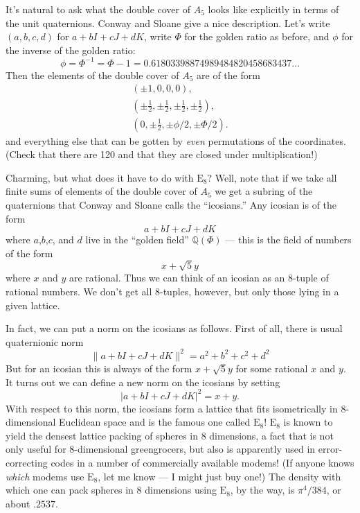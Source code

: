 \documentclass{article}
\begin{document}
It's natural to ask what the double cover of \(A_5\) looks like
explicitly in terms of the unit quaternions. Conway and Sloane give a
nice description. Let's write \((a,b,c,d)\) for \(a + bI + cJ + dK\),
write \(\Phi\) for the golden ratio as before, and \(\phi\) for the inverse of
the golden ratio:
\[\phi = \Phi^{-1} = \Phi -1 = 0.61803398874989484820458683437\ldots\] Then the
elements of the double cover of \(A_5\) are of the form \[
  \begin{gathered}
    (\pm 1, 0, 0, 0),
  \\(\pm \frac{1}{2}, \pm \frac{1}{2}, \pm \frac{1}{2}, \pm \frac{1}{2}),
  \\(0, \pm\frac{1}{2}, \pm \phi/2, \pm \Phi/2).
  \end{gathered}
\] and everything else that can be gotten by \emph{even} permutations of
the coordinates. (Check that there are 120 and that they are closed
under multiplication!)

Charming, but what does it have to do with \(\mathrm{E}_8\)? Well, note
that if we take all finite sums of elements of the double cover of
\(A_5\) we get a subring of the quaternions that Conway and Sloane calls
the ``icosians.'' Any icosian is of the form \[a + bI + cJ + dK\] where
\(a\),\(b\),\(c\), and \(d\) live in the ``golden field''
\(\mathbb{Q}(\Phi)\) --- this is the field of numbers of the form
\[x + \sqrt{5} y\] where \(x\) and \(y\) are rational. Thus we can think
of an icosian as an 8-tuple of rational numbers. We don't get all
8-tuples, however, but only those lying in a given lattice.

In fact, we can put a norm on the icosians as follows. First of all,
there is usual quaternionic norm
\[\|a + bI + cJ + dK\|^2 = a^2 + b^2 + c^2 + d^2\] But for an icosian
this is always of the form \(x + \sqrt{5} y\) for some rational \(x\)
and \(y\). It turns out we can define a new norm on the icosians by
setting 
\[|a + bI + cJ + dK|^2 = x + y.\] 
With respect to this norm, the
icosians form a lattice that fits isometrically in \(8\)-dimensional
Euclidean space and is the famous one called \(\mathrm{E}_8\)!
\(\mathrm{E}_8\) is known to yield the densest lattice packing of
spheres in 8 dimensions, a fact that is not only useful for
8-dimensional greengrocers, but also is apparently used in
error-correcting codes in a number of commercially available modems! (If
anyone knows \emph{which} modems use \(\mathrm{E}_8\), let me know --- I
might just buy one!) The density with which one can pack spheres in 8
dimensions using \(\mathrm{E}_8\), by the way, is \(\pi^4/384\), or
about \(.2537\).
\end{document}

